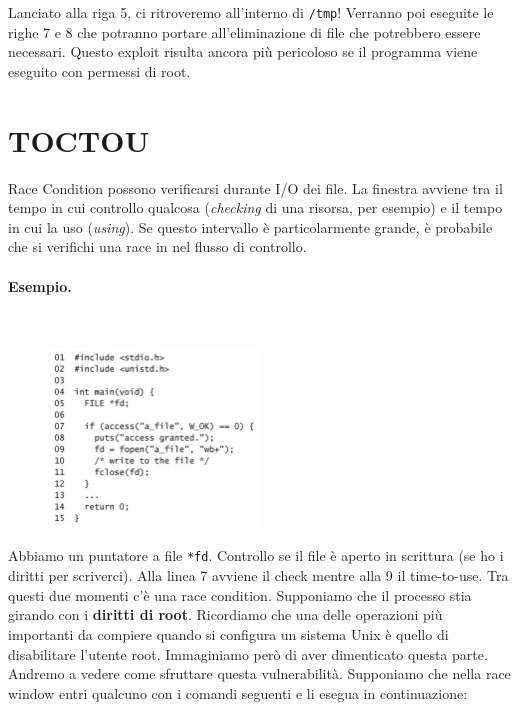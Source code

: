 Lanciato alla riga 5, ci ritroveremo all'interno di \verb|/tmp|!
Verranno poi eseguite le righe 7 e 8 che potranno portare all'eliminazione
di file che potrebbero essere necessari. Questo exploit risulta ancora più
pericoloso se il programma viene eseguito con permessi di root.

\section{TOCTOU}

Race Condition possono verificarsi durante I/O dei file.
La finestra avviene tra il tempo in cui controllo qualcosa
(\textit{checking} di una risorsa, per esempio) e il tempo in cui la uso (\textit{using}).
Se questo intervallo è particolarmente grande, è probabile che si verifichi una race in nel flusso di controllo.

\paragraph{Esempio.}\ \\

\begin{figure}
    \centering
    \includegraphics[width=0.5\textwidth, keepaspectratio]{capitoli/secure_coding/img/cap_6/esempio_file.png}
\end{figure}

Abbiamo un puntatore a file \verb|*fd|.
Controllo se il file è aperto in scrittura (se ho i diritti per scriverci).
Alla linea 7 avviene il check mentre alla 9 il time-to-use.
Tra questi due momenti c'è una race condition.
Supponiamo che il processo stia girando con i \textbf{diritti di root}.
Ricordiamo che una delle operazioni più importanti da compiere quando si configura
un sistema Unix è quello di disabilitare l'utente root.
Immaginiamo però di aver dimenticato questa parte. Andremo a vedere come sfruttare
questa vulnerabilità.
Supponiamo che nella race window entri qualcuno con i comandi seguenti e li esegua in continuazione:

